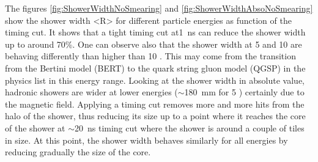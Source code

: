 The figures \ref{fig:ShowerWidthNoSmearing} and \ref{fig:ShowerWidthAbsoNoSmearing} show the shower width <R> for different particle energies as function of the timing cut. It shows that a tight timing cut at\SI{1}{\nano\second} can reduce the shower width up to around 70\%. One can observe also that the shower width at 5 and 10 \GeV are behaving differently than higher than 10 \GeV. This may come from the transition from the Bertini model (BERT) to the quark string gluon model (QGSP) in the physics list in this energy range. Looking at the shower width in absolute value, hadronic showers are wider at lower energies ($\sim$\SI{180}{\milli\meter} for 5 \GeV) certainly due to the magnetic field. Applying a timing cut removes more and more hits from the halo of the shower, thus reducing its size up to a point where it reaches the core of the shower at $\sim$\SI{20}{\nano\second} timing cut where the shower is around a couple of tiles in size. At this point, the shower width behaves similarly for all energies by reducing gradually the size of the core.

